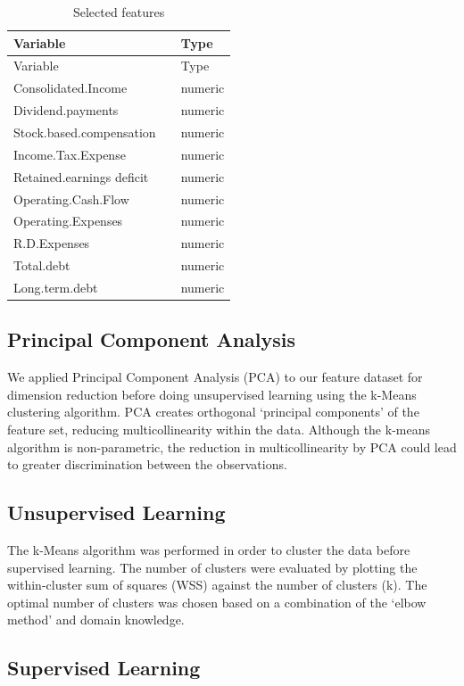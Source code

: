 \documentclass[11pt,]{article}
\begin{document}
\begin{longtable}[]{@{}lll@{}}
\caption{Selected features}\tabularnewline
\toprule
Variable & & Type\tabularnewline
\midrule
\endfirsthead
\toprule
Variable & & Type\tabularnewline
\midrule
\endhead
Consolidated.Income & & numeric\tabularnewline
Dividend.payments & & numeric\tabularnewline
Stock.based.compensation & & numeric\tabularnewline
Income.Tax.Expense & & numeric\tabularnewline
Retained.earnings deficit & & numeric\tabularnewline
Operating.Cash.Flow & & numeric\tabularnewline
Operating.Expenses & & numeric\tabularnewline
R.D.Expenses & & numeric\tabularnewline
Total.debt & & numeric\tabularnewline
Long.term.debt & & numeric\tabularnewline
\bottomrule
\end{longtable}

\hypertarget{principal-component-analysis}{%
\subsection{Principal Component
Analysis}\label{principal-component-analysis}}

We applied Principal Component Analysis (PCA) to our feature dataset for
dimension reduction before doing unsupervised learning using the k-Means
clustering algorithm. PCA creates orthogonal `principal components' of
the feature set, reducing multicollinearity within the data. Although
the k-means algorithm is non-parametric, the reduction in
multicollinearity by PCA could lead to greater discrimination between
the observations.

\hypertarget{unsupervised-learning}{%
\subsection{Unsupervised Learning}\label{unsupervised-learning}}

The k-Means algorithm was performed in order to cluster the data before
supervised learning. The number of clusters were evaluated by plotting
the within-cluster sum of squares (WSS) against the number of clusters
(k). The optimal number of clusters was chosen based on a combination of
the `elbow method' and domain knowledge.

\hypertarget{supervised-learning}{%
\subsection{Supervised Learning}\label{supervised-learning}}
\end{document}
